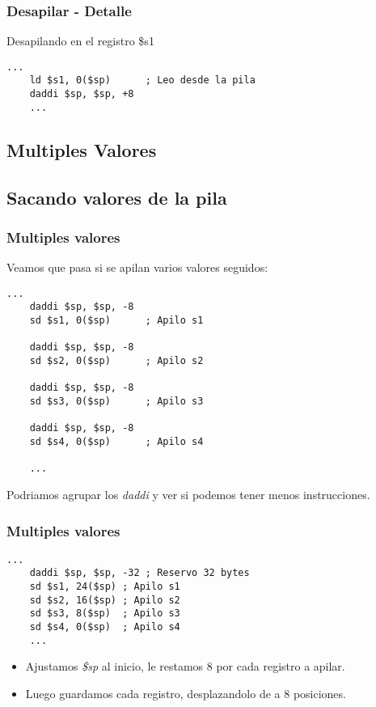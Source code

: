 \documentclass{beamer}
\begin{document}
\begin{frame}[fragile]
\frametitle{Desapilar - Detalle}


\begin{block}{Desapilando en el registro \$s1}
\begin{lstlisting}[language=WinMIPS64,basicstyle=\ttfamily,keywordstyle=\color{blue}]
    ...
    ld $s1, 0($sp)      ; Leo desde la pila
    daddi $sp, $sp, +8
    ...
\end{lstlisting}
\end{block}

\end{frame}


\subsection{Multiples Valores}

\subsection{Sacando valores de la pila}
\begin{frame}[fragile]
\frametitle{Multiples valores}
Veamos que pasa si se apilan varios valores seguidos:

\tiny{
\begin{block}{}
\begin{lstlisting}[language=WinMIPS64,basicstyle=\ttfamily,keywordstyle=\color{blue}]
    ...
    daddi $sp, $sp, -8
    sd $s1, 0($sp)      ; Apilo s1
	
    daddi $sp, $sp, -8
    sd $s2, 0($sp)      ; Apilo s2
	
    daddi $sp, $sp, -8
    sd $s3, 0($sp)      ; Apilo s3
	
    daddi $sp, $sp, -8
    sd $s4, 0($sp)      ; Apilo s4

    ...
\end{lstlisting}
\end{block}
}

Podriamos agrupar los \emph{daddi} y ver si podemos tener menos instrucciones.

\end{frame}


\begin{frame}[fragile]
\frametitle{Multiples valores}
\tiny{
\begin{block}{}
\begin{lstlisting}[language=WinMIPS64,basicstyle=\ttfamily,keywordstyle=\color{blue}]
    ...
    daddi $sp, $sp, -32 ; Reservo 32 bytes
    sd $s1, 24($sp) ; Apilo s1
    sd $s2, 16($sp) ; Apilo s2
    sd $s3, 8($sp)  ; Apilo s3
    sd $s4, 0($sp)  ; Apilo s4
    ...
\end{lstlisting}
\end{block}
}
\begin{itemize}
\item Ajustamos \emph{\$sp} al inicio, le restamos 8 por cada registro a apilar.
\item Luego guardamos cada registro, desplazandolo de a 8 posiciones.
\end{itemize}

\end{frame}
\end{document}
